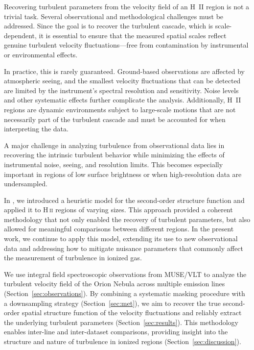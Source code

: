 \documentclass[fleqn,usenatbib, useAMS, a4paper]{mnras}
\begin{document}
Recovering turbulent parameters from the velocity field of an H~II region is not a trivial task. 
Several observational and methodological challenges must be addressed. Since the goal is to recover the turbulent cascade, which is scale-dependent, it is essential to ensure that the measured spatial scales reflect genuine turbulent velocity fluctuations—free from contamination by instrumental or environmental effects.

In practice, this is rarely guaranteed. 
Ground-based observations are affected by atmospheric seeing, and the smallest velocity fluctuations that can be detected are limited by the instrument’s spectral resolution and sensitivity. 
Noise levels and other systematic effects further complicate the analysis. Additionally, H~II regions are dynamic environments subject to large-scale motions that are not necessarily part of the turbulent cascade and must be accounted for when interpreting the data.

A major challenge in analyzing turbulence from observational data lies in recovering the intrinsic turbulent behavior while minimizing the effects of instrumental noise, seeing, and resolution limits.
This becomes especially important in regions of low surface brightness or when high-resolution data are undersampled.

In \citet{garciav23}, we introduced a heuristic model for the second-order structure function and applied it to H\,\textsc{ii} regions of varying sizes. 
This approach provided a coherent methodology that not only enabled the recovery of turbulent parameters, but also allowed for meaningful comparisons between different regions. 
In the present work, we continue to apply this model, extending its use to new observational data and addressing how to mitigate nuisance parameters that commonly affect the measurement of turbulence in ionized gas.

We use integral field spectroscopic observations from MUSE/VLT to analyze the turbulent velocity field of the Orion Nebula across multiple emission lines (Section~\ref{sec:observations}). 
By combining a systematic masking procedure with a downsampling strategy (Section~\ref{sec:met}), we aim to recover the true second-order spatial structure function of the velocity fluctuations and reliably extract the underlying turbulent parameters (Section~\ref{sec:results}). 
This methodology enables inter-line and inter-dataset comparisons, providing insight into the structure and nature of turbulence in ionized regions (Section~\ref{sec:discussion}).
\end{document}
